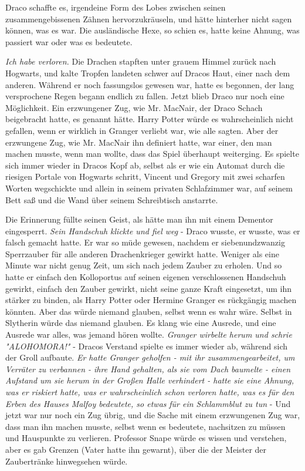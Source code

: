 {Draco schaffte es, irgendeine Form des Lobes zwischen seinen zusammengebissenen Zähnen hervorzukräuseln, und hätte hinterher nicht sagen können, was es war. Die ausländische Hexe, so schien es, hatte keine Ahnung, was passiert war oder was es bedeutete.

\emph{Ich habe verloren.} Die Drachen stapften unter grauem Himmel zurück nach Hogwarts, und kalte Tropfen landeten schwer auf Dracos Haut, einer nach dem anderen. Während er noch fassungslos gewesen war, hatte es begonnen, der lang versprochene Regen begann endlich zu fallen. Jetzt blieb Draco nur noch eine Möglichkeit. Ein erzwungener Zug, wie Mr. MacNair, der Draco Schach beigebracht hatte, es genannt hätte. Harry Potter würde es wahrscheinlich nicht gefallen, wenn er wirklich in Granger verliebt war, wie alle sagten. Aber der erzwungene Zug, wie Mr. MacNair ihn definiert hatte, war einer, den man machen musste, wenn man wollte, dass das Spiel überhaupt weiterging. Es spielte sich immer wieder in Dracos Kopf ab, selbst als er wie ein Automat durch die riesigen Portale von Hogwarts schritt, Vincent und Gregory mit zwei scharfen Worten wegschickte und allein in seinem privaten Schlafzimmer war, auf seinem Bett saß und die Wand über seinem Schreibtisch anstarrte.

Die Erinnerung füllte seinen Geist, als hätte man ihn mit einem Dementor eingesperrt. \emph{Sein Handschuh klickte und fiel weg} - Draco wusste, er wusste, was er falsch gemacht hatte. Er war so müde gewesen, nachdem er siebenundzwanzig Sperrzauber für alle anderen Drachenkrieger gewirkt hatte. Weniger als eine Minute war nicht genug Zeit, um sich nach jedem Zauber zu erholen. Und so hatte er einfach den Kolloportus auf seinen eigenen verschlossenen Handschuh gewirkt, einfach den Zauber gewirkt, nicht seine ganze Kraft eingesetzt, um ihn stärker zu binden, als Harry Potter oder Hermine Granger es rückgängig machen könnten. Aber das würde niemand glauben, selbst wenn es wahr wäre. Selbst in Slytherin würde das niemand glauben. Es klang wie eine Ausrede, und eine Ausrede war alles, was jemand hören wollte. \emph{Granger wirbelte herum und schrie "ALOHOMORA!"} - Dracos Verstand spielte es immer wieder ab, während sich der Groll aufbaute. \emph{Er hatte Granger geholfen - mit ihr zusammengearbeitet, um Verräter zu verbannen - ihre Hand gehalten, als sie vom Dach baumelte - einen Aufstand um sie herum in der Großen Halle verhindert - hatte sie eine Ahnung, was er riskiert hatte, was er wahrscheinlich schon verloren hatte, was es für den Erben des Hauses Malfoy bedeutete, so etwas} \emph{für ein Schlammblut zu tun} - Und jetzt war nur noch ein Zug übrig, und die Sache mit einem erzwungenen Zug war, dass man ihn machen musste, selbst wenn es bedeutete, nachsitzen zu müssen und Hauspunkte zu verlieren. Professor Snape würde es wissen und verstehen, aber es gab Grenzen (Vater hatte ihn gewarnt), über die der Meister der Zaubertränke hinwegsehen würde.

}
